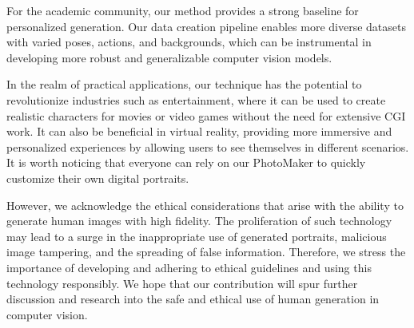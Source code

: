 For the academic community, our method provides a strong baseline for personalized generation. 
Our data creation pipeline enables more diverse datasets with varied poses, actions, and backgrounds, which can be instrumental in developing more robust and generalizable computer vision models.

In the realm of practical applications, our technique has the potential to revolutionize industries such as entertainment, where it can be used to create realistic characters for movies or video games without the need for extensive CGI work.
It can also be beneficial in virtual reality, providing more immersive and personalized experiences by allowing users to see themselves in different scenarios.
It is worth noticing that everyone can rely on our PhotoMaker to quickly customize their own digital portraits.

However, we acknowledge the ethical considerations that arise with the ability to generate human images with high fidelity.
The proliferation of such technology may lead to a surge in the inappropriate use of generated portraits, malicious image tampering, and the spreading of false information.
Therefore, we stress the importance of developing and adhering to ethical guidelines and using this technology responsibly. 
We hope that our contribution will spur further discussion and research into the safe and ethical use of human generation in computer vision.